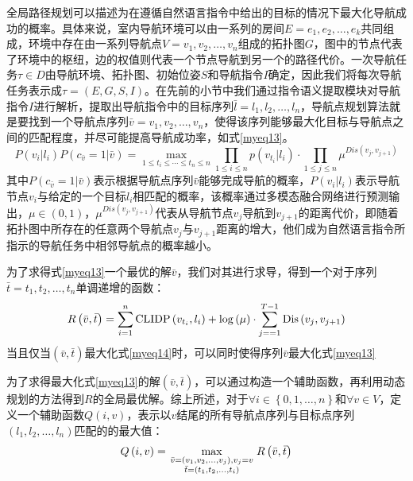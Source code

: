 全局路径规划可以描述为在遵循自然语言指令中给出的目标的情况下最大化导航成功的概率。具体来说，室内导航环境可以由一系列的房间$E = {e_1},{e_2}, \ldots ,{e_k}$共同组成，环境中存在由一系列导航点$V = {v_1},{v_2}, \ldots ,{v_n}$组成的拓扑图$G$，图中的节点代表了环境中的枢纽，边的权值则代表一个节点导航到另一个的路径代价。一次导航任务$\tau  \in D$由导航环境、拓扑图、初始位姿$S$和导航指令$I$确定，因此我们将每次导航任务表示成$\tau  = \left( {E,G,S,I} \right)$。在先前的小节中我们通过指令语义提取模块对导航指令$I$进行解析，提取出导航指令中的目标序列$\bar l = {l_1},{l_2}, \ldots ,{l_n}$，导航点规划算法就是要找到一个导航点序列$\bar v = {v_1},{v_2}, \ldots ,{v_n}$，使得该序列能够最大化目标与导航点之间的匹配程度，并尽可能提高导航成功率，如式\ref{myeq13}。
\begin{equation}
	P\left( {{v_i}|{l_i}} \right)P\left( {{c_{\bar v}} = 1|\bar v} \right) = \mathop {\max }\limits_{1 \le {t_i} \le  \cdots  \le {t_n} \le n} \prod\limits_{1 \le i \le n} {p\left( {{v_{{t_i}}}|{l_i}} \right) \cdot \prod\limits_{1 \le j \le n} {{\mu ^{Dis\left( {{v_j},{v_{j + 1}}} \right)}}} } 
	\label{myeq13}
\end{equation}
其中$P\left( {{c_{\bar v}} = 1|\bar v} \right)$表示根据导航点序列$\bar v$能够完成导航的概率，$P\left( {{v_i}|{l_i}} \right)$表示导航节点${v_i}$与给定的一个目标${l_i}$相匹配的概率，该概率通过多模态融合网络进行预测输出，$\mu  \in \left( {0,1} \right)$，${{\mu ^{Dis\left( {{v_j},{v_{j + 1}}} \right)}}}$代表从导航节点${{v_{j}}}$导航到${{v_{j + 1}}}$的距离代价，即随着拓扑图中所存在的任意两个导航点${v_j}$与${v_{j + 1}}$距离的增大，他们成为自然语言指令所指示的导航任务中相邻导航点的概率越小。

为了求得式\ref{myeq13}一个最优的解${\bar v}$，我们对其进行求导，得到一个对于序列$\bar t = {t_1},{t_2}, \ldots ,{t_n}$单调递增的函数：
\begin{equation}
	R\left( {\bar v,\bar t} \right) = \sum\limits_{i = 1}^n {{\rm{CLIDP}}\left( {{v_{{t_i}}},{l_i}} \right) + \log \left( \mu  \right) \cdot \sum\limits_{j =  = 1}^{T - 1} {{\rm{Dis}}\left( {{v_j},{v_{j + 1}}} \right)} } 
	\label{myeq14}
\end{equation}
当且仅当$\left( {\bar v,\bar t} \right)$最大化式\ref{myeq14}时，可以同时使得序列${\bar v}$最大化式\ref{myeq13}

为了求得最大化式\ref{myeq13}的解$\left( {\bar v,\bar t} \right)$，可以通过构造一个辅助函数，再利用动态规划的方法得到$R$的全局最优解。综上所述，对于$\forall i \in \left\{ {0,1, \ldots ,n} \right\}$和$\forall v \in V$，定义一个辅助函数$Q\left( {i,v} \right)$，表示以$v$结尾的所有导航点序列与目标点序列$\left( {{l_1},{l_2}, \ldots ,{l_n}} \right)$匹配的的最大值：
\begin{equation}
	Q\left( {i,v} \right) = \mathop {\max }\limits_{\scriptstyle\bar v = \left( {{v_1},{v_2}, \ldots ,{v_j}} \right),{v_j} = v\atop
\scriptstyle\bar t = \left( {{t_1},{t_2}, \ldots ,{t_i}} \right)} R\left( {\bar v,\bar t} \right)
	\label{myeq15}
\end{equation}

